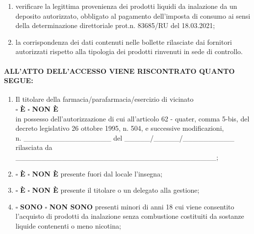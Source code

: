 \documentclass[12pt]{article}
\begin{document}
\begin{enumerate}
    \item verificare la legittima provenienza dei prodotti liquidi da inalazione da un deposito autorizzato, obbligato al pagamento dell’imposta di consumo ai sensi della determinazione direttoriale prot.n. 83685/RU del 18.03.2021;
    \item la corrispondenza dei dati contenuti nelle bollette rilasciate dai fornitori autorizzati rispetto alla tipologia dei prodotti rinvenuti in sede di controllo.
\end{enumerate}

\paragraph{ALL'ATTO DELL'ACCESSO VIENE RISCONTRATO QUANTO SEGUE:}

\begin{enumerate}
    \item Il titolare della farmacia/parafarmacia/esercizio di vicinato \\ \begin{math}\square\end{math} \textbf{È} \begin{math}\square\end{math} \textbf{NON È} \\ in possesso dell’autorizzazione di cui all’articolo 62 - quater, comma 5-bis, del decreto legislativo 26 ottobre 1995, n. 504, e successive modificazioni, \\ n. \_\_\_\_\_\_\_\_\_\_\_\_\_\_\_\_\_ del \_\_\_\_\_/\_\_\_\_\_/\_\_\_\_\_\_\_\_\_\_ rilasciata da \_\_\_\_\_\_\_\_\_\_\_\_\_\_\_\_\_\_\_\_\_\_\_\_\_\_\_\_\_\_\_\_\_\_\_\_\_\_\_;
    \item \begin{math}\square\end{math} \textbf{È} \begin{math}\square\end{math} \textbf{NON È} presente fuori dal locale l'insegna;
    \item \begin{math}\square\end{math} \textbf{È} \begin{math}\square\end{math} \textbf{NON È} presente il titolare o un delegato alla gestione;
    \item \begin{math}\square\end{math} \textbf{SONO} \begin{math}\square\end{math} \textbf{NON SONO} presenti minori di anni 18 cui viene consentito l’acquisto di prodotti da inalazione senza combustione costituiti da sostanze liquide contenenti o meno nicotina;

\end{enumerate}
\end{document}
